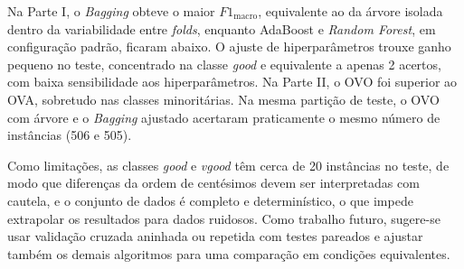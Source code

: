 \documentclass[11pt, a4paper]{article}
\begin{document}
Na Parte I, o \textit{Bagging} obteve o maior $F1_{\mathrm{macro}}$, equivalente ao da árvore isolada dentro da variabilidade entre \textit{folds}, enquanto AdaBoost e \textit{Random Forest}, em configuração padrão, ficaram abaixo. O ajuste de hiperparâmetros trouxe ganho pequeno no teste, concentrado na classe \textit{good} e equivalente a apenas 2 acertos, com baixa sensibilidade aos hiperparâmetros. Na Parte II, o OVO foi superior ao OVA, sobretudo nas classes minoritárias. Na mesma partição de teste, o OVO com árvore e o \textit{Bagging} ajustado acertaram praticamente o mesmo número de instâncias (506 e 505).

Como limitações, as classes \textit{good} e \textit{vgood} têm cerca de 20 instâncias no teste, de modo que diferenças da ordem de centésimos devem ser interpretadas com cautela, e o conjunto de dados é completo e determinístico, o que impede extrapolar os resultados para dados ruidosos. Como trabalho futuro, sugere-se usar validação cruzada aninhada ou repetida com testes pareados e ajustar também os demais algoritmos para uma comparação em condições equivalentes.



\end{document}
